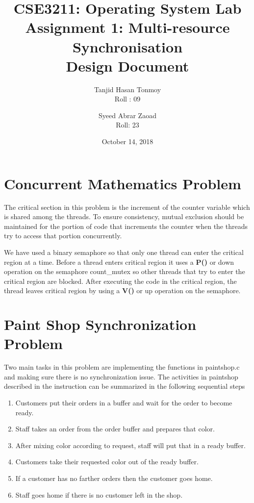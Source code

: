 \documentclass[11pt, english]{article}
\title{CSE3211: Operating System Lab \\ Assignment 1: Multi-resource Synchronisation \\ Design Document } %
\author{Tanjid Hasan Tonmoy\\
	 Roll : 09
	\and
Syeed Abrar Zaoad\\
Roll: 23
}
\date{October 14, 2018}
\begin{document}
\maketitle


\section{Concurrent Mathematics Problem}

The critical section in this problem is the increment of the counter variable which is shared among the threads.
To ensure consistency, mutual exclusion should be maintained for the portion of code that increments the counter when the threads try to access that portion concurrently.

We have used a binary semaphore so that only one thread can enter the critical region at a time. Before a thread enters critical region it uses a \textbf{P()} or down operation on the semaphore count\_mutex so other threads that try to enter the critical region are blocked. After executing the code in the critical region, the thread leaves critical region by using a \textbf{V()} or up operation on the semaphore.

\section{Paint Shop Synchronization Problem}

Two main tasks in this problem are implementing the functions in paintshop.c and making sure there is no synchronization issue.
The activities in paintshop described in the instruction can be summarized in the following sequential steps
\begin{enumerate}
 \item Customers put their orders in a buffer and wait for the order to become ready.
 \item Staff takes an order from the order buffer and prepares that color.
 \item After mixing color according to request, staff will put that in a ready buffer.
 \item Customers take their requested color out of the ready buffer.
 \item If a customer has no farther orders then the customer goes home.
 \item Staff goes home if there is no customer left in the shop.
\end{enumerate}
\end{document}

